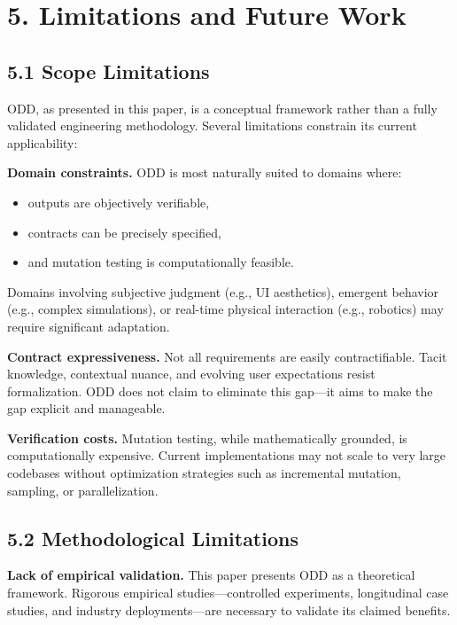 \documentclass[
]{article}
\begin{document}
\hypertarget{5-limitations-and-future-work}{%
\section{5. Limitations and Future
Work}\label{5-limitations-and-future-work}}

\hypertarget{51-scope-limitations}{%
\subsection{5.1 Scope Limitations}\label{51-scope-limitations}}

ODD, as presented in this paper, is a conceptual framework rather than a
fully validated engineering methodology. Several limitations constrain
its current applicability:

\textbf{Domain constraints.} ODD is most naturally suited to domains
where:

\begin{itemize}
\item
  outputs are objectively verifiable,
\item
  contracts can be precisely specified,
\item
  and mutation testing is computationally feasible.
\end{itemize}

Domains involving subjective judgment (e.g., UI aesthetics), emergent
behavior (e.g., complex simulations), or real-time physical interaction
(e.g., robotics) may require significant adaptation.

\textbf{Contract expressiveness.} Not all requirements are easily
contractifiable. Tacit knowledge, contextual nuance, and evolving user
expectations resist formalization. ODD does not claim to eliminate this
gap---it aims to make the gap explicit and manageable.

\textbf{Verification costs.} Mutation testing, while mathematically
grounded, is computationally expensive. Current implementations may not
scale to very large codebases without optimization strategies such as
incremental mutation, sampling, or parallelization.

\hypertarget{52-methodological-limitations}{%
\subsection{5.2 Methodological
Limitations}\label{52-methodological-limitations}}

\textbf{Lack of empirical validation.} This paper presents ODD as a
theoretical framework. Rigorous empirical studies---controlled
experiments, longitudinal case studies, and industry deployments---are
necessary to validate its claimed benefits.
\end{document}
